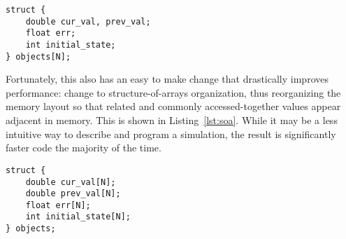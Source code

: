 \begin{minipage}{\linewidth}
	\begin{lstlisting}[frame=single,label=lst:aos,caption={[Array-of-structures organization.]Array-of-structures organization. Each attribute of a cell is declared as a field in the structure, and an array of such structures is defined. This can be a slower way of organizing data.}]
struct {
	double cur_val, prev_val;
	float err;
	int initial_state;
} objects[N];
\end{lstlisting}
\end{minipage}

Fortunately, this also has an easy to make change that drastically improves performance: change to structure-of-arrays organization, thus reorganizing the memory layout so that related and commonly accessed-together values
appear adjacent in memory\cite{intel-opt}. This is shown in Listing~\ref{lst:soa}. While it may be a less intuitive way to describe
and program a simulation, the result is significantly faster code the majority of the time.

\vspace{5mm}

\begin{minipage}{\linewidth}
	\begin{lstlisting}[frame=single,label=lst:soa,caption={[Structure-of-arrays organization.]Structure-of-arrays organization. Instead, now each attribute is its own array, thus placing them all in a contiguous region of memory, which can result in better performance.}]
struct {
	double cur_val[N];
	double prev_val[N];
	float err[N];
	int initial_state[N];
} objects;
\end{lstlisting}
\end{minipage}
















